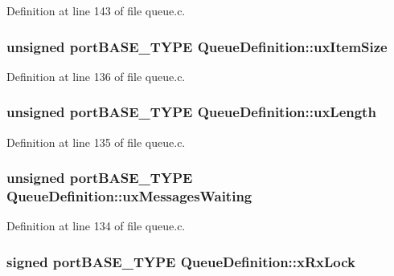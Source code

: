 Definition at line 143 of file queue.\-c.

\hypertarget{struct_queue_definition_ad8719a7d6da96299b7ed158a621ae7e5}{
\subsubsection[{ux\-Item\-Size}]{\setlength{\rightskip}{0pt plus 5cm}unsigned port\-B\-A\-S\-E\-\_\-\-T\-Y\-P\-E Queue\-Definition\-::ux\-Item\-Size}}\label{struct_queue_definition_ad8719a7d6da96299b7ed158a621ae7e5}


Definition at line 136 of file queue.\-c.

\hypertarget{struct_queue_definition_af1edbb7426dad16a57e1fc6bb475bc7e}{
\subsubsection[{ux\-Length}]{\setlength{\rightskip}{0pt plus 5cm}unsigned port\-B\-A\-S\-E\-\_\-\-T\-Y\-P\-E Queue\-Definition\-::ux\-Length}}\label{struct_queue_definition_af1edbb7426dad16a57e1fc6bb475bc7e}


Definition at line 135 of file queue.\-c.

\hypertarget{struct_queue_definition_a8e3b24b25631daa65cc8b860346013e3}{
\subsubsection[{ux\-Messages\-Waiting}]{ unsigned port\-B\-A\-S\-E\-\_\-\-T\-Y\-P\-E Queue\-Definition\-::ux\-Messages\-Waiting}}\label{struct_queue_definition_a8e3b24b25631daa65cc8b860346013e3}


Definition at line 134 of file queue.\-c.

\hypertarget{struct_queue_definition_ad7c6ccbee34deed4a438354a0d3cf765}{
\subsubsection[{x\-Rx\-Lock}]{\setlength{\rightskip}{0pt plus 5cm}signed port\-B\-A\-S\-E\-\_\-\-T\-Y\-P\-E Queue\-Definition\-::x\-Rx\-Lock}}\label{struct_queue_definition_ad7c6ccbee34deed4a438354a0d3cf765}


